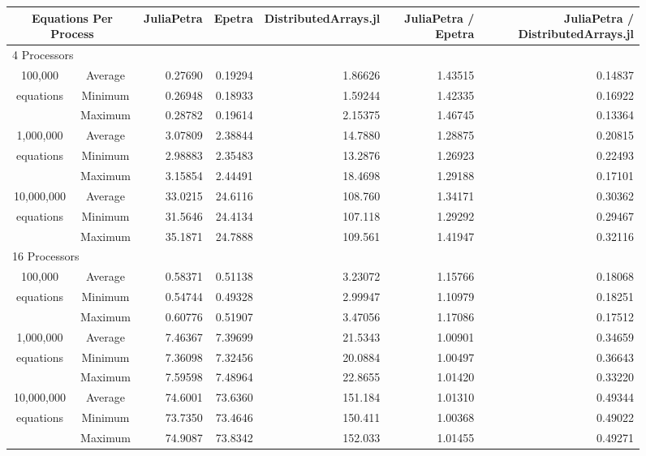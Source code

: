\documentclass[acmsmall]{acmart}
\begin{document}
\begin{figure}
\begin{tabular}{|c c|r|r|r||r|r|}
	\hline
		\multicolumn{2}{|c|}{Equations Per Process}
		& JuliaPetra
		& Epetra
		& \multicolumn{1}{m{1.8cm}||}{Distributed\-Arrays.jl}
		& \multicolumn{1}{m{1.75cm}|}{JuliaPetra / Epetra}
		& \multicolumn{1}{m{1.8cm}|}{JuliaPetra / Distributed\-Arrays.jl} \\
	\hline
		\multicolumn{7}{|l|}{4 Processors}\\
	\hline
		100,000			&Average & 0.27690 & 0.19294 & 1.86626 & 1.43515 & 0.14837 \\
		equations		&Minimum & 0.26948 & 0.18933 & 1.59244 & 1.42335 & 0.16922 \\
						&Maximum & 0.28782 & 0.19614 & 2.15375 & 1.46745 & 0.13364 \\
	\hline
		1,000,000		&Average & 3.07809 & 2.38844 & 14.7880 & 1.28875 & 0.20815 \\
		equations		&Minimum & 2.98883 & 2.35483 & 13.2876 & 1.26923 & 0.22493 \\
						&Maximum & 3.15854 & 2.44491 & 18.4698 & 1.29188 & 0.17101 \\
	\hline
		10,000,000		&Average & 33.0215 & 24.6116 & 108.760 & 1.34171 & 0.30362 \\
		equations		&Minimum & 31.5646 & 24.4134 & 107.118 & 1.29292 & 0.29467 \\
						&Maximum & 35.1871 & 24.7888 & 109.561 & 1.41947 & 0.32116 \\
	\hline
		\multicolumn{7}{|l|}{16 Processors}\\
	\hline
		100,000			&Average & 0.58371 & 0.51138 & 3.23072 & 1.15766 & 0.18068 \\
		equations		&Minimum & 0.54744 & 0.49328 & 2.99947 & 1.10979 & 0.18251 \\
						&Maximum & 0.60776 & 0.51907 & 3.47056 & 1.17086 & 0.17512 \\
	\hline
		1,000,000		&Average & 7.46367 & 7.39699 & 21.5343 & 1.00901 & 0.34659 \\
		equations		&Minimum & 7.36098 & 7.32456 & 20.0884 & 1.00497 & 0.36643 \\
						&Maximum & 7.59598 & 7.48964 & 22.8655 & 1.01420 & 0.33220 \\
	\hline
		10,000,000		&Average & 74.6001 & 73.6360 & 151.184 & 1.01310 & 0.49344 \\
		equations		&Minimum & 73.7350 & 73.4646 & 150.411 & 1.00368 & 0.49022 \\
						&Maximum & 74.9087 & 73.8342 & 152.033 & 1.01455 & 0.49271 \\

\end{tabular}
\end{figure}
\end{document}
